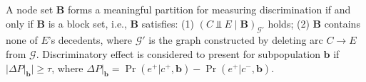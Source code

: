 \documentclass[twoside,leqno,twocolumn]{article}
\begin{document}


\begin{theorem}\label{thm:dce}
A node set $\mathbf{B}$ forms a meaningful partition for measuring discrimination if and only if $\mathbf{B}$ is a block set, i.e., $\mathbf{B}$ satisfies: (1) $(C\Perp E \mid \mathbf{B})_{\mathcal{G}'}$ holds; (2) $\mathbf{B}$ contains none of $E$'s decedents, where $\mathcal{G}'$ is the graph constructed by deleting arc $C\rightarrow E$ from $\mathcal{G}$. Discriminatory effect is considered to present for subpopulation $\mathbf{b}$ if $|\Delta P|_{\mathbf{b}}| \geq \tau$, where $\Delta P|_{\mathbf{b}} = \Pr(e^{+}|c^{+},\mathbf{b}) - \Pr(e^{+}|c^{-},\mathbf{b})$. 
\end{theorem}

\end{document}
